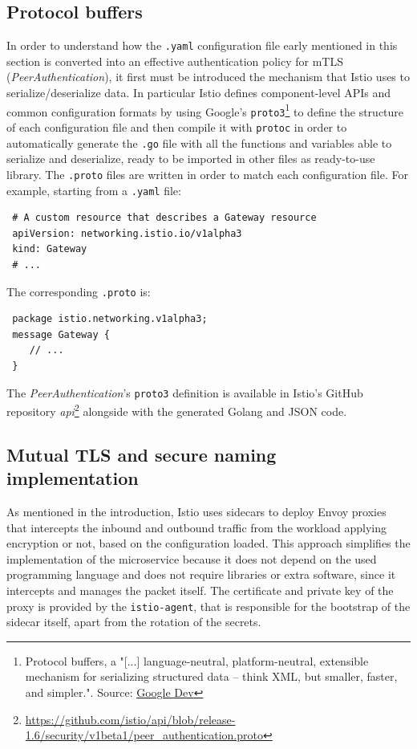 \subsection{Protocol buffers}
In order to understand how the \texttt{.yaml} configuration file early mentioned in this section is converted into an effective authentication policy for mTLS (\textit{PeerAuthentication}), it first must be introduced the mechanism that Istio uses to serialize/deserialize data. In particular Istio defines component-level APIs and common configuration formats by using Google's \texttt{proto3}\footnote{Protocol buffers, a "[...] language-neutral, platform-neutral, extensible mechanism for serializing structured data – think XML, but smaller, faster, and simpler.". Source: \href{https://developers.google.com/protocol-buffers}{Google Dev}} to define the structure of each configuration file and then compile it with \texttt{protoc} in order to automatically generate the \texttt{.go} file with all the functions and variables able to serialize and deserialize, ready to be imported in other files as ready-to-use library. The \texttt{.proto} files are written in order to match each configuration file. For example, starting from a \texttt{.yaml} file:

\begin{lstlisting}
 # A custom resource that describes a Gateway resource
 apiVersion: networking.istio.io/v1alpha3
 kind: Gateway
 # ...
\end{lstlisting}

\noindent The corresponding \texttt{.proto} is:

\begin{lstlisting}
 package istio.networking.v1alpha3;
 message Gateway {
    // ...
 }
\end{lstlisting}

The \textit{PeerAuthentication}'s \texttt{proto3} definition is available in Istio's GitHub repository \textit{api}\footnote{\url{https://github.com/istio/api/blob/release-1.6/security/v1beta1/peer_authentication.proto}} alongside with the generated Golang and JSON code.

\subsection{Mutual TLS and secure naming implementation}
As mentioned in the introduction, Istio uses sidecars to deploy Envoy proxies that intercepts the inbound and outbound traffic from the workload applying encryption or not, based on the configuration loaded. This approach simplifies the implementation of the microservice because it does not depend on the used programming language and does not require libraries or extra software, since it intercepts and manages the packet itself. 
The certificate and private key of the proxy is provided by the \texttt{istio-agent}, that is responsible for the bootstrap of the sidecar itself, apart from the rotation of the secrets.

